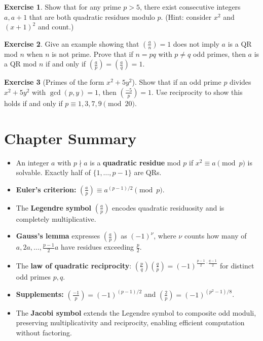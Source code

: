 \documentclass[12pt,a4paper,openany]{book}
\theoremstyle{definition}
\newtheorem{exercise}{Exercise}[chapter]
\theoremstyle{plain}
\theoremstyle{remark}
\newcommand{\legendre}[2]{\left(\frac{#1}{#2}\right)}
\newcommand{\jacobi}[2]{\left(\frac{#1}{#2}\right)}
\begin{document}
\begin{exercise}
\label{exer:qr-consecutive}
Show that for any prime $p > 5$, there exist consecutive integers $a, a+1$
that are both quadratic residues modulo $p$.
\textup{(}Hint: consider $x^2$ and $(x+1)^2$ and count.\textup{)}
\end{exercise}

\begin{exercise}
\label{exer:jacobi-nonresidue}
Give an example showing that $\jacobi{a}{n} = 1$ does not imply $a$ is a QR mod $n$
when $n$ is not prime. Prove that if $n = pq$ with $p \neq q$ odd primes,
then $a$ is a QR mod $n$ if and only if $\legendre{a}{p} = \legendre{a}{q} = 1$.
\end{exercise}

\begin{exercise}[Primes of the form $x^2 + 5y^2$]
\label{exer:qr-representation}
Show that if an odd prime $p$ divides $x^2 + 5y^2$ with $\gcd(p, y) = 1$,
then $\legendre{-5}{p} = 1$. Use reciprocity to show this holds if and only if
$p \equiv 1, 3, 7, 9 \pmod{20}$.
\end{exercise}

\section*{Chapter Summary}

\begin{itemize}
  \item An integer $a$ with $p \nmid a$ is a \textbf{quadratic residue} mod $p$ if
    $x^2 \equiv a \pmod{p}$ is solvable. Exactly half of $\{1, \ldots, p-1\}$ are QRs.

  \item \textbf{Euler's criterion:}
    $\legendre{a}{p} \equiv a^{(p-1)/2} \pmod{p}$.

  \item The \textbf{Legendre symbol} $\legendre{a}{p}$ encodes quadratic residuosity
    and is completely multiplicative.

  \item \textbf{Gauss's lemma} expresses $\legendre{a}{p}$ as $(-1)^\nu$, where
    $\nu$ counts how many of $a, 2a, \ldots, \frac{p-1}{2}a$ have
    residues exceeding $\frac{p}{2}$.

  \item The \textbf{law of quadratic reciprocity}:
    $\legendre{p}{q}\legendre{q}{p} = (-1)^{\frac{p-1}{2}\cdot\frac{q-1}{2}}$
    for distinct odd primes $p, q$.

  \item \textbf{Supplements:} $\legendre{-1}{p} = (-1)^{(p-1)/2}$ and
    $\legendre{2}{p} = (-1)^{(p^2-1)/8}$.

  \item The \textbf{Jacobi symbol} extends the Legendre symbol to composite odd moduli,
    preserving multiplicativity and reciprocity, enabling efficient computation
    without factoring.
\end{itemize}
\end{document}
